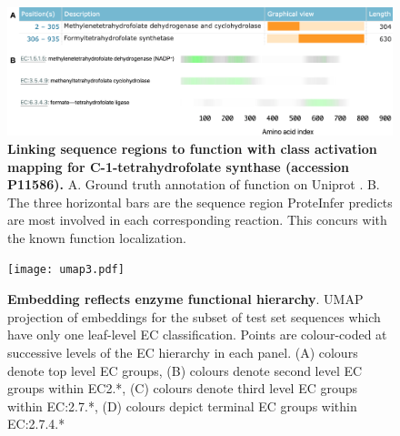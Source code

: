 \begin{figure}[t]
  \centering
    \DIFdelbeginFL %
\DIFdelendFL \DIFaddbeginFL \includegraphics[width=\textwidth]{tetrahydrofolate_synthase.png}
    \DIFaddendFL %
    \caption{\textbf{Linking sequence regions to function with class activation mapping for C-1-tetrahydrofolate synthase (accession P11586).} A. Ground truth annotation of function on Uniprot \citep{uniprotlatest}. B. The three horizontal bars are the sequence region ProteInfer predicts are most involved in each corresponding reaction. This concurs with the known function localization. }
    \label{fig:cam}
  \end{figure}

  \begin{figure}
    \centering
      \DIFdelbeginFL %
\DIFdelendFL \DIFaddbeginFL \texttt{[image: umap3.pdf]}\DIFaddendFL %
      \caption{\textbf{Embedding reflects enzyme functional hierarchy}. UMAP projection of embeddings for the subset of test set sequences which have only one leaf-level EC classification. Points are colour-coded at successive levels of the EC hierarchy in each panel. (A) colours denote top level EC groups, (B) colours denote second level EC groups within EC2.*, (C) colours denote third level EC groups within EC:2.7.*, (D) colours depict terminal EC groups within EC:2.7.4.* }
      \label{fig:umap}
    \end{figure}

